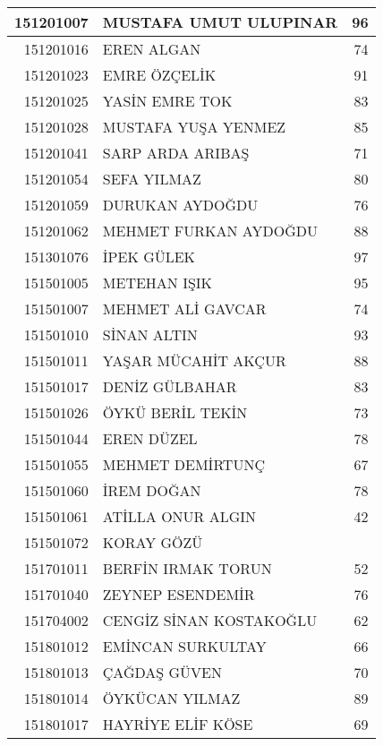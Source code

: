 \documentclass[12pt]{article}
\begin{document}
\begin{multicols}{2}
\begin{longtable}{||r||l||r||}
    151201007 & MUSTAFA UMUT ULUPINAR & 96 \\
    \midrule
    151201016 & EREN ALGAN & 74 \\
    \midrule
    151201023 & EMRE ÖZÇELİK & 91 \\
    \midrule
    151201025 & YASİN EMRE TOK & 83 \\
    \midrule
    151201028 & MUSTAFA YUŞA YENMEZ & 85 \\
    \midrule
    151201041 & SARP ARDA ARIBAŞ & 71 \\
    \midrule
    151201054 & SEFA YILMAZ & 80 \\
    \midrule
    151201059 & DURUKAN AYDOĞDU & 76 \\
    \midrule
    151201062 & MEHMET FURKAN AYDOĞDU & 88 \\
    \midrule
    151301076 & İPEK GÜLEK & 97 \\
    \midrule
    151501005 & METEHAN IŞIK & 95 \\
    \midrule
    151501007 & MEHMET ALİ GAVCAR & 74 \\
    \midrule
    151501010 & SİNAN ALTIN & 93 \\
    \midrule
    151501011 & YAŞAR MÜCAHİT AKÇUR & 88 \\
    \midrule
    151501017 & DENİZ GÜLBAHAR & 83 \\
    \midrule
    151501026 & ÖYKÜ BERİL TEKİN & 73 \\
    \midrule
    151501044 & EREN DÜZEL & 78 \\
    \midrule
    151501055 & MEHMET DEMİRTUNÇ & 67 \\
    \midrule
    151501060 & İREM DOĞAN & 78 \\
    \midrule
    151501061 & ATİLLA ONUR ALGIN & 42 \\
    \midrule
    151501072 & KORAY GÖZÜ &  \\
    \midrule
    151701011 & BERFİN IRMAK TORUN & 52 \\
    \midrule
    151701040 & ZEYNEP ESENDEMİR & 76 \\
    \midrule
    151704002 & CENGİZ SİNAN KOSTAKOĞLU & 62 \\
    \midrule
    151801012 & EMİNCAN SURKULTAY & 66 \\
    \midrule
    151801013 & ÇAĞDAŞ GÜVEN & \cellcolor[rgb]{ 1,  1,  0} 70 \\
    \midrule
    151801014 & ÖYKÜCAN YILMAZ & \cellcolor[rgb]{ 1,  1,  0} 89 \\
    \midrule
    151801017 & HAYRİYE ELİF KÖSE & 69 \\

\end{longtable}
\end{multicols}
\end{document}
